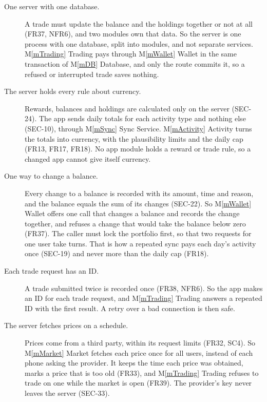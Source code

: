 \documentclass[12pt, titlepage]{article}
\newcommand{\mref}[1]{M\ref{#1}}
\begin{document}
\begin{description}
\item[One server with one database.] A trade must update the balance and the
  holdings together or not at all (FR37, NFR6), and two modules own that data.
  So the server is one process with one database, split into modules, and not
  separate services. \mref{mTrading} Trading pays through \mref{mWallet} Wallet
  in the same transaction of \mref{mDB} Database, and only the route commits
  it, so a refused or interrupted trade saves nothing.

\item[The server holds every rule about currency.] Rewards, balances and
  holdings are calculated only on the server (SEC-24). The app sends daily
  totals for each activity type and nothing else (SEC-10), through
  \mref{mSync} Sync Service. \mref{mActivity} Activity turns the totals into
  currency, with the plausibility limits and the daily cap (FR13, FR17, FR18).
  No app module holds a reward or trade rule, so a changed app cannot give
  itself currency.

\item[One way to change a balance.] Every change to a balance is recorded with
  its amount, time and reason, and the balance equals the sum of its changes
  (SEC-22). So \mref{mWallet} Wallet offers one call that changes a balance and
  records the change together, and refuses a change that would take the balance
  below zero (FR37). The caller must lock the portfolio first, so that two
  requests for one user take turns. That is how a repeated sync pays each day's
  activity once (SEC-19) and never more than the daily cap (FR18).

\item[Each trade request has an ID.] A trade submitted twice is recorded once
  (FR38, NFR6). So the app makes an ID for each trade request, and
  \mref{mTrading} Trading answers a repeated ID with the first result. A retry
  over a bad connection is then safe.

\item[The server fetches prices on a schedule.] Prices come from a third
  party, within its request limits (FR32, SC4). So \mref{mMarket} Market
  fetches each price once for all users, instead of each phone asking the
  provider. It keeps the time each price was obtained, marks a price that is
  too old (FR33), and \mref{mTrading} Trading refuses to trade on one while the
  market is open (FR39). The provider's key never leaves the server (SEC-33).


\end{description}
\end{document}
